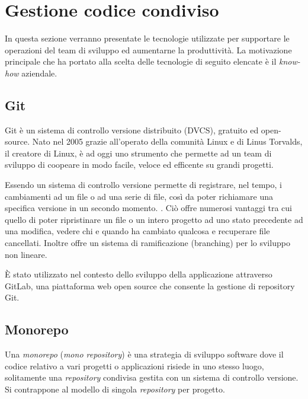 \section{Gestione codice condiviso}
In questa sezione verranno presentate le tecnologie utilizzate per supportare le operazioni
del team di sviluppo ed aumentarne la produttività.
La motivazione principale che ha portato alla scelta delle tecnologie di seguito elencate è il \textit{know-how} aziendale.

\subsection{Git}
Git \cite{Git} è un sistema di controllo versione distribuito (DVCS), gratuito ed open-source.
Nato nel 2005 grazie all'operato della comunità Linux e di Linus Torvalds, il creatore di Linux, è ad oggi uno strumento che
permette ad un team di sviluppo di coopeare in modo facile, veloce ed efficente su grandi progetti.

Essendo un sistema di controllo versione permette di registrare, nel tempo, i cambiamenti ad un file o ad una serie di file,
così da poter richiamare una specifica versione in un secondo momento. \cite{GitPro}.
Ciò offre numerosi vantaggi tra cui quello di poter ripristinare un file o un intero progetto ad uno stato precedente ad una modifica,
vedere chi e quando ha cambiato qualcosa e recuperare file cancellati.
Inoltre offre un sistema di ramificazione (branching) per lo sviluppo non lineare.

È stato utilizzato nel contesto dello sviluppo della applicazione attraverso GitLab, una piattaforma web open source che consente
la gestione di repository Git.

\subsection{Monorepo}
Una \textit{monorepo}\cite{Google-Monorepo} (\textit{mono repository}) è una strategia di sviluppo software dove il codice
relativo a vari progetti o applicazioni risiede in uno stesso luogo, solitamente una \textit{repository} condivisa
gestita con un sistema di controllo versione.
Si contrappone al modello di singola \textit{repository} per progetto.

